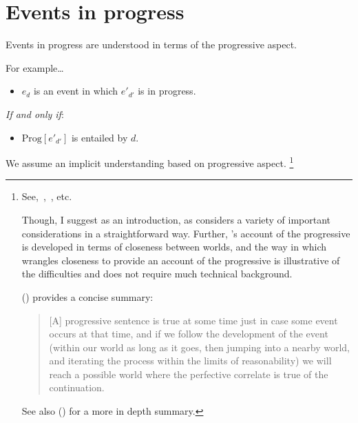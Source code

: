\section{Events in progress}
\label{sec:events-progress}


\begin{note}
  Events in progress are understood in terms of the progressive aspect.

  For example\dots

  

  \begin{definition}
    \label{def:es-in-prog}
    \vspace{-\baselineskip}
    \begin{itemize}
    \item
      \(e_{d}\) is an event in which \(e'_{d'}\) is in progress.
    \end{itemize}
    \emph{If and only if}:
    \begin{itemize}
    \item
      \(\text{Prog}[e'_{d'}]\) is entailed by \(d\).
    \end{itemize}
    \vspace{-\baselineskip}
  \end{definition}

  \noindent%
  We assume an implicit understanding based on progressive aspect.%
  \footnote{
    \nocite{Portner:1998um}
    \nocite{Engelberg:1999vi}
    See,~\textcite{Richards:1981wo},~\textcite{Portner:2011vi}, etc.

    Though, I suggest \textcite{Landman:1992wh} as an introduction, as \citeauthor{Landman:1992wh} considers a variety of important considerations in a straightforward way.
    Further, \citeauthor{Landman:1992wh}'s account of the progressive is developed in terms of closeness between worlds, and the way in which \citeauthor{Landman:1992wh} wrangles closeness to provide an account of the progressive is illustrative of the difficulties and does not require much technical background.

    \citeauthor{Szabo:2004ul} (\citeyear[34]{Szabo:2004ul}) provides a concise summary:
    \begin{quote}
      [A] progressive sentence is true at some time just in case some event occurs at that time, and if we follow the development of the event (within our world as long as it goes, then jumping into a nearby world, and iterating the process within the limits of reasonability) we will reach a possible world where the perfective correlate is true of the continuation.
    \end{quote}
    See also (\cite[764--766]{Portner:1998um}) for a more in depth summary.

}
\end{note}
